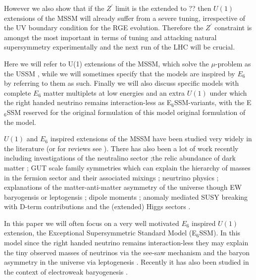 \documentclass[preprint,amsmath,amssymb,aps,superscriptaddress,prd,showpacs,floatfix]{revtex4-1}
\begin{document}
However we also show that if the $Z^\prime$ limit is the extended to
?? then $U(1)$ extensions of the MSSM will already suffer from a
severe tuning, irrespective of the UV boundary condition for the RGE
evolution.  Therefore the $Z^\prime$ constraint is amongst the most
important in terms of tuning and attacking natural supersymmetry
experimentally and the next run of the LHC will be crucial.



Here we will refer to U(1) extensions of the MSSM, which solve the
$\mu$-problem as the USSM
\cite{Cvetic:1995rj, Jain:1995cb, Nir:1995bu, Cvetic:1996mf, Cvetic:1997ky}, while we will
sometimes specify that the models are inspired by $E_6$ by referring
to them as such. Finally we will also discuss specific models with
complete $E_6$ matter multiplets at low energies and an extra $U(1)$
under which the right handed neutrino remains interaction-less as
E$_6$SSM-variants\cite{Howl:2007zi, Braam:2009fi, Braam:2010sy, Hall:2011zq, Nevzorov:2012hs, Athron:2014pua}, with the E$_6$SSM reserved for the original
formulation of this model \cite{King:2005jy,King:2005my,Athron:2010zz}
original formulation of the model.
 
$U(1)$ and $E_6$ inspired extensions of the MSSM have been studied
very widely in the literature \cite{Gunion:1989we, Gunion:1992hs,
  Binetruy:1985xm, Ellis:1986yg, Ibanez:1986si, Gunion:1986ky,
  Haber:1986gz, Baer:1987eb, Gunion:1987jd, Grifols:1986vr,
  Ellis:1986ip, Morris:1987fm, Drees:1987tp, Ma:1995xk,
  Suematsu:1997tv, Suematsu:1997qt, Suematsu:1997au, Keith:1996fv,
  Keith:1997zb, Gherghetta:1996yr, Demir:1998dk, Langacker:1998tc,
  Hambye:2000bn, Ma:2000jf} (or for reviews see
\cite{Hewett:1988xc,Langacker:2008yv}).  There has also been a lot of
work recently including investigations of the neutralino sector
\cite{Hesselbach:2001ri, Barger:2005hb, Choi:2006fz,
  Barger:2007nv};the relic abundance of dark matter
\cite{Kalinowski:2008iq}; GUT scale family symmetries which can
explain the hierarchy of masses in the fermion sector and their
associated mixings \cite{Stech:2008wd}; neurtrino physics
\cite{Kang:2004ix}; explanations of the matter-anti-matter asymmetry
of the universe though EW baryogensis or leptogensis
\cite{Hambye:2000bn,Ma:2000jf,Kang:2004pp}; dipole moments
\cite{GutierrezRodriguez:2006hb}; anomaly mediated SUSY breaking with
D-term contributions \cite{Asano:2008ju} and the (extended) Higgs
sectors \cite{Daikoku:2000ep,Ham:2008xf}.


In this paper we will often focus on a very well motivated $E_6$
inspired $U(1)$ extension, the Exceptional Supersymmetric Standard
Model (E$_6$SSM)\cite{King:2005jy,King:2005my,Athron:2010zz}.  In this
model since the right handed neutrino remains interaction-less they may
explain the tiny observed masses of neutrinos via the see-saw
mechanism and the baryon asymmetry in the universe via leptogenesis
\cite{Hambye:2000bn,King:2008qb, King:2008gw}.  Recently it has also been studied in the context of electroweak baryogenesis \cite{Chao:2014hya}.
\end{document}
